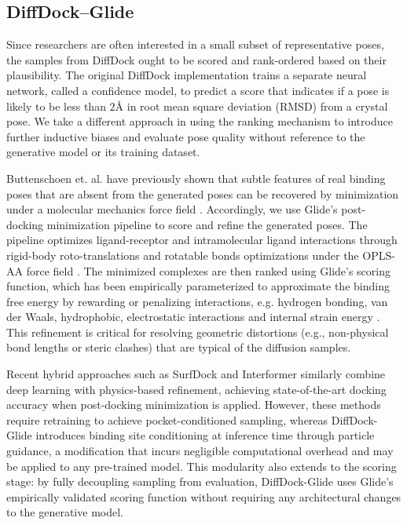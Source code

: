 \documentclass[letterpaper]{article}
\begin{document}
\subsection{DiffDock--Glide}
Since researchers are often interested in a small subset of representative poses, the samples from DiffDock ought to be scored and rank-ordered based on their plausibility. The original DiffDock implementation trains a separate neural network, called a confidence model, to predict a score that indicates if a pose is likely to be less than $2${\AA} in root mean square deviation (RMSD) from a crystal pose. We take a different approach in using the ranking mechanism to introduce further inductive biases and evaluate pose quality without reference to the generative model or its training dataset.

Buttenschoen et. al. have previously shown that subtle features of real binding poses that are absent from the generated poses can be recovered by minimization under a molecular mechanics force field \cite{buttenschoen2024posebusters}. Accordingly, we use Glide's post-docking minimization pipeline to score and refine the generated poses. The pipeline optimizes ligand-receptor and intramolecular ligand interactions through rigid-body roto-translations and rotatable bonds optimizations under the OPLS-AA force field \cite{friesner2004glide}. The minimized complexes are then ranked using Glide's scoring function, which has been empirically parameterized to approximate the binding free energy by rewarding or penalizing interactions, e.g. hydrogen bonding, van der Waals, hydrophobic, electrostatic interactions and internal strain energy \cite{friesner2004glide}. This refinement is critical for resolving geometric distortions (e.g., non-physical bond lengths or steric clashes) that are typical of the diffusion samples.

Recent hybrid approaches such as SurfDock and Interformer similarly combine deep learning with physics-based refinement, achieving state-of-the-art docking accuracy when post-docking minimization is applied.\cite{lai2024interformer,cao2025surfdock} However, these methods require retraining to achieve pocket-conditioned sampling, whereas DiffDock-Glide introduces binding site conditioning at inference time through particle guidance, a modification that incurs negligible computational overhead and may be applied to any pre-trained model. This modularity also extends to the scoring stage: by fully decoupling sampling from evaluation, DiffDock-Glide uses Glide's empirically validated scoring function without requiring any architectural changes to the generative model.
\end{document}
